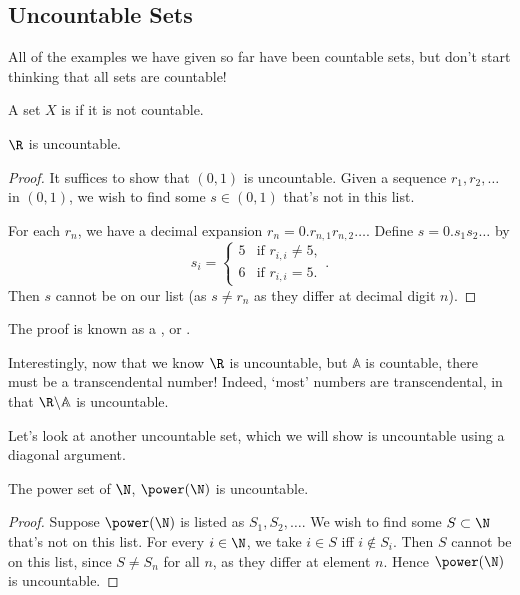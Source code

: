 \subsection{Uncountable Sets}

All of the examples we have given so far have been countable sets, but don't start thinking that all sets are countable! 

\begin{definition}[Uncountability]
	A set $X$ is  if it is not countable.
\end{definition}


\begin{theorem}
	$\R$ is uncountable.
\end{theorem}
\begin{proof}
	It suffices to show that $(0, 1)$ is uncountable. Given a sequence $r_1, r_2, \dots$ in $(0, 1)$, we wish to find some $s \in (0, 1)$ that's not in this list.
	
	For each $r_n$, we have a decimal expansion $r_n = 0.r_{n,1} r_{n,2}\dots$. Define $s = 0.s_1 s_2\dots$ by
	$$
	s_i = \begin{cases}
		5 &\mbox{if } r_{i, i} \neq 5, \\
		6 &\mbox{if } r_{i, i} = 5.
	   \end{cases}.
	$$
	Then $s$ cannot be on our list (as $s \neq r_n$ as they differ at decimal digit $n$).
\end{proof}

The proof is known as a , or . 

Interestingly, now that we know $\R$ is uncountable, but $\mathbb{A}$ is countable, there must be a transcendental number! Indeed, `most' numbers are transcendental, in that $\R \backslash \mathbb{A}$ is uncountable.

Let's look at another uncountable set, which we will show is uncountable using a diagonal argument.

\begin{theorem}
	The power set of $\N$, $\power(\N)$ is uncountable.
\end{theorem}
\begin{proof}
	Suppose $\power(\N)$ is listed as $S_1, S_2, \dots$. We wish to find some $S \subset \N$ that's not on this list.
	For every $i \in \N$, we take $i \in S$ iff $i \not \in S_i$. Then $S$ cannot be on this list, since $S \neq S_n$ for all $n$, as they differ at element $n$.
	Hence $\power(\N)$ is uncountable.
\end{proof}

